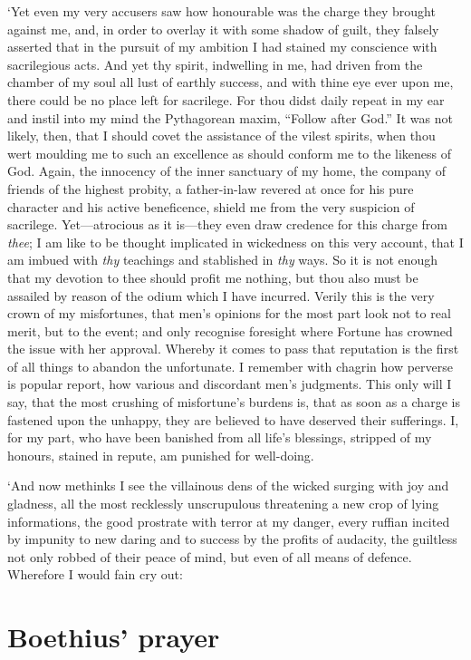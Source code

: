 \documentclass[11pt]{book}
\begin{document}
`Yet even my very accusers saw how honourable was the charge they
brought against me, and, in order to overlay it with some shadow of
guilt, they falsely asserted that in the pursuit of my ambition I had
stained my conscience with sacrilegious acts. And yet thy spirit,
indwelling in me, had driven from the chamber of my soul all lust of
earthly success, and with thine eye ever upon me, there could be no
place left for sacrilege. For thou didst daily repeat in my ear and
instil into my mind the Pythagorean maxim, ``Follow after God.'' It was
not likely, then, that I should covet the assistance of the vilest
spirits, when thou wert moulding me to such an excellence as should
conform me to the likeness of God. Again, the innocency of the inner
sanctuary of my home, the company of friends of the highest probity, a
father-in-law revered at once for his pure character and his active
beneficence, shield me from the very suspicion of sacrilege.
Yet---atrocious as it is---they even draw credence for this charge from
\emph{thee}; I am like to be thought implicated in wickedness on this very
account, that I am imbued with \emph{thy} teachings and stablished in \emph{thy}
ways. So it is not enough that my devotion to thee should profit me
nothing, but thou also must be assailed by reason of the odium which I
have incurred. Verily this is the very crown of my misfortunes, that
men's opinions for the most part look not to real merit, but to the
event; and only recognise foresight where Fortune has crowned the issue
with her approval. Whereby it comes to pass that reputation is the first
of all things to abandon the unfortunate. I remember with chagrin how
perverse is popular report, how various and discordant men's judgments.
This only will I say, that the most crushing of misfortune's burdens is,
that as soon as a charge is fastened upon the unhappy, they are believed
to have deserved their sufferings. I, for my part, who have been
banished from all life's blessings, stripped of my honours, stained in
repute, am punished for well-doing.

`And now methinks I see the villainous dens of the wicked surging with
joy and gladness, all the most recklessly unscrupulous threatening a new
crop of lying informations, the good prostrate with terror at my danger,
every ruffian incited by impunity to new daring and to success by the
profits of audacity, the guiltless not only robbed of their peace of
mind, but even of all means of defence. Wherefore I would fain cry out:


\section{Boethius' prayer}
\end{document}
